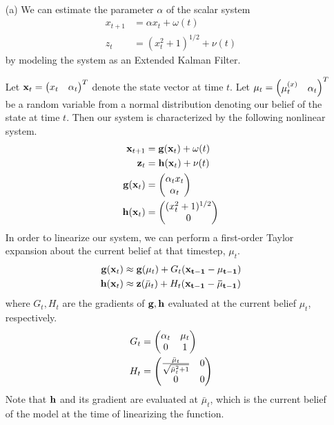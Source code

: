 \documentclass{article}
\begin{document}
    \newpage
    \begin{question}
        ~
        \begin{enumerate}
            \item[(a)] We can estimate the parameter $\alpha$ of the scalar system 
            \begin{align*}
                x_{t+1} &= \alpha x_t + \omega(t) \\
                z_t &= (x_t^2 + 1)^{1/2} + \nu(t)
            \end{align*}
            by modeling the system as an Extended Kalman Filter. 
            
            Let $\vb{x}_t = \begin{pmatrix} x_t & \alpha_t \end{pmatrix}^T$ denote the state vector at time $t$. Let $\vb{\mu}_t = \begin{pmatrix} \mu_t^{(x)} & \alpha_t \end{pmatrix}^T$ be a random variable from a normal distribution denoting our belief of the state at time $t$. Then our system is characterized by the following nonlinear system.
            \begin{align*}
                \vb{x}_{t+1} &= \vb{g}(\vb{x}_t) + \omega(t) \\
                \vb{z}_t &= \vb{h}(\vb{x}_t) + \nu(t) \\
                \vb{g}(\vb{x}_t) &= \begin{pmatrix}  \alpha_t x_t  \\ \alpha_t \end{pmatrix} \\
                \vb{h}(\vb{x}_t) &= \begin{pmatrix} (x_t^2 + 1)^{1/2} \\ 0 \end{pmatrix}
            \end{align*}
            In order to linearize our system, we can perform a first-order Taylor expansion about the current belief at that timestep, $\mu_t$.
            \begin{align}
                \vb{g}(\vb{x}_t) &\approx \vb{g}(\vb{\mu}_t) + G_t(\vb{x_{t-1} - \mu_{t-1}}) \\
                \vb{h}(\vb{x}_t) &\approx \vb{z}(\bar{\mu}_t) + H_t(\vb{x_{t-1} - \bar{\mu}_{t-1}})
            \end{align}
            where $G_t, H_t$ are the gradients of $\vb{g}, \vb{h}$ evaluated at the current belief $\mu_t$, respectively.
            \begin{align}
                G_t &= \begin{pmatrix} \alpha_t & \mu_t \\ 0 & 1 \end{pmatrix} \\
                H_t & = \begin{pmatrix} \frac{\bar{\mu}_t}{\sqrt{\bar{\mu}_t^2 + 1}} & 0 \\ 0 & 0 \end{pmatrix}
            \end{align}
            Note that $\vb{h}$ and its gradient are evaluated at $\bar{\mu}_t$, which is the current belief of the model at the time of linearizing the function.


\end{enumerate}
\end{question}
\end{document}
